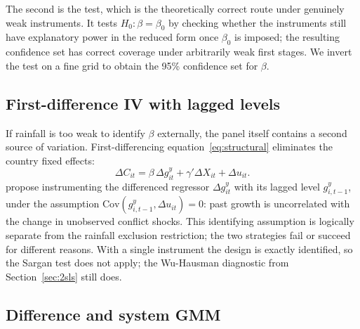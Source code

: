 \documentclass[11pt,a4paper]{article}
\begin{document}
The second is the \citet{AndersonRubin1949} test, which is the
theoretically correct route under genuinely weak instruments. It tests
$H_0\colon \beta = \beta_0$ by checking whether the instruments still
have explanatory power in the reduced form once $\beta_0$ is imposed;
the resulting confidence set has correct coverage under arbitrarily
weak first stages. We invert the test on a fine grid to obtain the 95\%
confidence set for $\beta$.

\subsection{First-difference IV with lagged levels}\label{sec:ahiv}

If rainfall is too weak to identify $\beta$ externally, the panel
itself contains a second source of variation. First-differencing
equation~\eqref{eq:structural} eliminates the country fixed effects:
\[
\Delta C_{it} = \beta\, \Delta g^{y}_{it} + \gamma' \Delta X_{it}
              + \Delta u_{it}.
\]
\citet{AndersonHsiao1981} propose instrumenting the differenced
regressor $\Delta g^{y}_{it}$ with its lagged level $g^{y}_{i,t-1}$,
under the assumption $\mathrm{Cov}(g^{y}_{i,t-1},\Delta u_{it}) = 0$:
past growth is uncorrelated with the change in unobserved conflict
shocks. This identifying assumption is logically separate from the
rainfall exclusion restriction; the two strategies fail or succeed for
different reasons. With a single instrument the design is exactly
identified, so the Sargan test does not apply; the Wu-Hausman
diagnostic from Section~\ref{sec:2sls} still does.

\subsection{Difference and system GMM}\label{sec:gmm}
\end{document}
